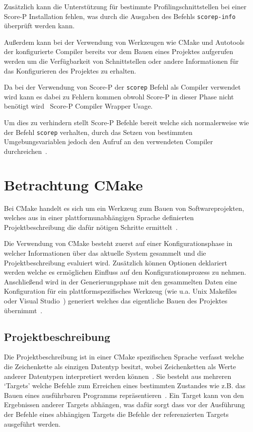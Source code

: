 \documentclass[german,proseminar,hyperref,utf8,lof]{zihpub}
\begin{document}
    Zusätzlich kann die Unterstützung für bestimmte Profilingschnittstellen bei einer Score-P
    Installation fehlen, was durch die Ausgaben des Befehls \texttt{scorep-info} überprüft werden kann.

    Au{\ss}erdem kann bei der Verwendung von Werkzeugen wie CMake und Autotools der konfigurierte Compiler
    bereits vor dem Bauen eines Projektes aufgerufen werden um die Verfügbarkeit von Schnittstellen
    oder andere Informationen für das Konfigurieren des Projektes zu erhalten.

    Da bei der Verwendung von Score-P der \texttt{scorep} Befehl als Compiler verwendet wird kann es dabei
    zu Fehlern kommen obwohl Score-P in dieser Phase nicht benötigt wird~
    {Score-P Compiler Wrapper Usage}.

    Um dies zu verhindern stellt Score-P Befehle bereit welche sich normalerweise wie der Befehl
    \texttt{scorep} verhalten, durch das Setzen von bestimmten Umgebungsvariablen jedoch den Aufruf an den
    verwendeten Compiler durchreichen~.

    \newpage
    \section{Betrachtung CMake}
    Bei CMake handelt es sich um ein Werkzeug zum Bauen von Softwareprojekten, welches aus in einer
    plattformunabhängigen Sprache definierten Projektbeschreibung die dafür nötigen Schritte
    ermittelt~.

    Die Verwendung von CMake besteht zuerst auf einer Konfigurationsphase in welcher Informationen
    über das aktuelle System gesammelt und die Projektbeschreibung evaluiert wird.
    Zusätzlich können Optionen deklariert werden welche es ermöglichen Einfluss auf den
    Konfigurationsprozess zu nehmen.
    Anschlie{\ss}end wird in der Generierungsphase mit den gesammelten Daten eine Konfiguration
    für ein plattformspezifisches Werkzeug (wie u.a. Unix Makefiles oder Visual Studio~)
    generiert welches das eigentliche Bauen des Projektes übernimmt~.

    \subsection{Projektbeschreibung}
    Die Projektbeschreibung ist in einer CMake spezifischen Sprache verfasst welche die Zeichenkette
    als einzigen Datentyp besitzt, wobei Zeichenketten als Werte anderer Datentypen interpretiert
    werden können~.
    Sie besteht aus mehreren `Targets' welche Befehle zum Erreichen eines bestimmten Zustandes wie
    z.B. das Bauen eines ausführbaren Programms repräsentieren~.
    Ein Target kann von den Ergebnissen anderer Targets abhängen, was dafür sorgt dass vor der
    Ausführung der Befehle eines abhängigen Targets die Befehle der referenzierten Targets ausgeführt werden.
\end{document}
